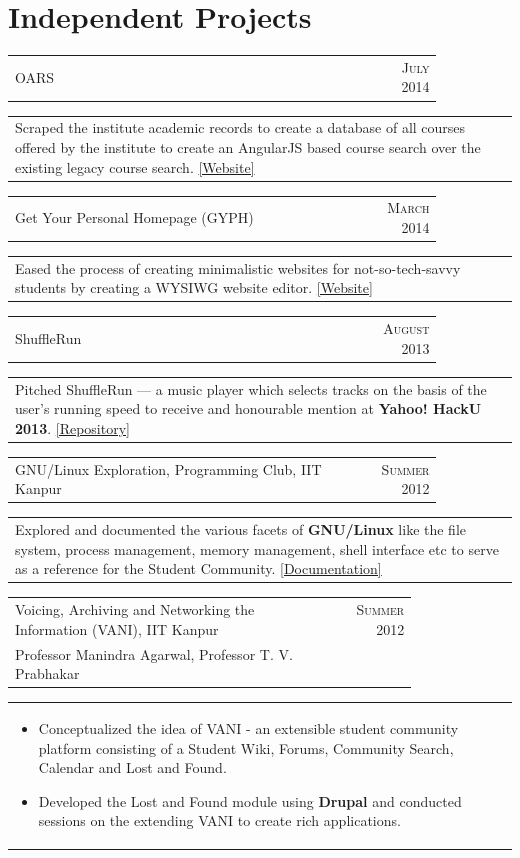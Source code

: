 \documentclass[a4paper,10pt]{article} %
\newcommand{\lproject}[4]{
    \begin{tabular}{p{0.80\linewidth}r}
        \textcolor{NavyBlue}{#2} & \multicolumn{1}{m{4cm}}{\raggedleft \textsc{#1}}\\
        #3
    \end{tabular}
    \begin{tabular}{p{\linewidth}}
    \vspace{-0.3cm}
        \footnotesize{#4}
    \end{tabular}
    \vspace{-0.5cm}
}
\newcommand{\siproject}[3]{
    \begin{tabular}{p{0.85\linewidth}r}
        \textcolor{NavyBlue}{#2} & \multicolumn{1}{m{3cm}}{\raggedleft \textsc{#1}}\\
    \end{tabular}
    \begin{tabular}{p{\linewidth}}
    \vspace{-0.3cm}
        \footnotesize{#3}
    \end{tabular}
    \vspace{-0.3cm}
}
\begin{document}
\section{Independent Projects}

\siproject {July 2014}
          {OARS}
          {
              Scraped the institute academic records to create a database of all courses offered by the institute to create an
              AngularJS based course search over the existing legacy course search.  \href{https://navya.github.io/oars}{[Website]}
           }

\siproject {March 2014}
          {Get Your Personal Homepage (GYPH)}
          {
               Eased the process of creating minimalistic websites for not-so-tech-savvy students by creating a WYSIWG website
               editor.  \href{http://gyph2.herokuapp.com/} {[Website]}
           }

\siproject {August 2013}
           {ShuffleRun}
           {
               Pitched ShuffleRun --- a music player which selects tracks on the basis of the user's running speed to receive
               and honourable mention at \textbf{Yahoo! HackU 2013}.  \href{https://github.com/srijanshetty/ShuffleRun} {[Repository]}
           }

\siproject {Summer 2012}
           {GNU/Linux Exploration, Programming Club, IIT Kanpur}
           {
              Explored and documented the various facets of \textbf{GNU/Linux} like the file system,
              process management, memory management, shell interface etc to serve as a reference for the
              Student Community.
              \href{https://docs.google.com/document/d/1ZHO9w36aoq3oaZBR4Um1AOmDfiTDAEgM6baQAu3icw4/edit?usp=sharing}{[Documentation]}
           }

\lproject {Summer 2012}
          {Voicing, Archiving and Networking the Information \textsc{(VANI)}, IIT Kanpur}
          {Professor Manindra Agarwal, Professor T. V. Prabhakar}
          {
              \begin{itemize}[leftmargin=0.5cm]
                  \item Conceptualized the idea of VANI - an extensible student community platform consisting
                      of a Student Wiki, Forums, Community Search, Calendar and Lost and Found.
                  \item Developed the Lost and Found module using \textbf{Drupal}
                      and conducted sessions on the extending VANI to create rich applications.
              \end{itemize}
          }
\end{document}
